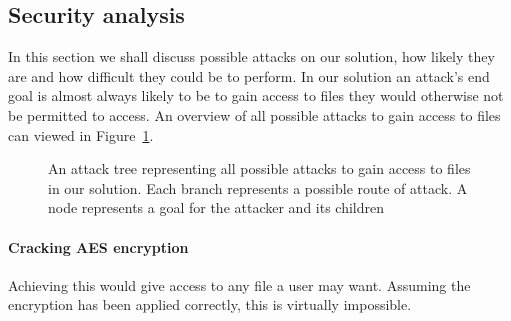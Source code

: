 \documentclass[12pt, titlepage]{article}
\begin{document}
\subsection{Security analysis}
In this section we shall discuss possible attacks on our solution, how likely they are and how difficult they could be to perform.
\newline \indent In our solution an attack's end goal is almost always likely to be to gain access to files they would otherwise not be permitted to access.
\newline \indent An overview of all possible attacks to gain access to files can viewed in Figure~\ref{fig:attackTree}.

\begin{landscape}
\begin{figure}


\caption{An attack tree representing all possible attacks to gain access to files in our solution. Each branch represents a possible route of attack. A node represents a goal for the attacker and its children}
\label{fig:attackTree}
\end{figure}
\end{landscape}

\paragraph*{Cracking AES encryption} Achieving this would give access to any file a user may want. Assuming the encryption has been applied correctly, this is virtually impossible.
\end{document}
